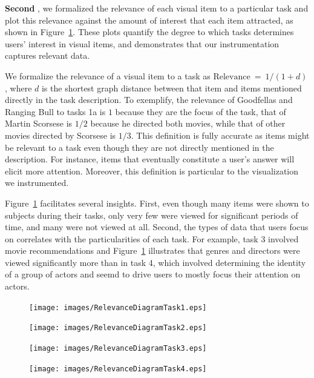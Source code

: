 \vspace{2mm}\noindent
\textbf{Second }, we formalized the relevance of each visual item to a particular task and plot this relevance against the amount of interest that each item attracted, as shown in Figure~\ref{fig:RelevanceDiagram}. These plots quantify the degree to which tasks determines users’ interest in visual items, and demonstrates that our instrumentation captures relevant data.    

We formalize the relevance of a visual item to a task as $\text{Relevance}~=~1/(1+d)$, where $d$  is the shortest graph distance between that item and items mentioned directly in the task description.  To exemplify, the relevance of Goodfellas and Ranging Bull to tasks 1a is $1$ because they are the focus of the task, that of Martin Scorsese is $1/2$  because he directed both movies, while that of other movies directed by Scorsese is $1/3$. This definition is fully accurate as items might be relevant to a task even though they are not directly mentioned in the description.  For instance, items that eventually constitute a user's answer will elicit more attention. Moreover, this definition is particular to the visualization we instrumented.

Figure~\ref{fig:RelevanceDiagram} facilitates several insights. First, even though many items were shown to subjects during their tasks, only very few were viewed for significant periods of time, and many were not viewed at all. Second, the types of data that users focus on correlates with the particularities of each task. For example, task 3 involved movie recommendations and Figure~\ref{fig:RelevanceDiagram} illustrates that genres and directors were viewed significantly more than in task 4, which involved determining the identity of a group of actors and seemd to drive users to mostly focus their attention on actors. 

\begin{figure}[!htb]
  \centering
  \texttt{[image: images/RelevanceDiagramTask1.eps]}
	
	\texttt{[image: images/RelevanceDiagramTask2.eps]}
	
	\texttt{[image: images/RelevanceDiagramTask3.eps]}
	
	\texttt{[image: images/RelevanceDiagramTask4.eps]}
	
	\label{fig:RelevanceDiagram}
\end{figure}

